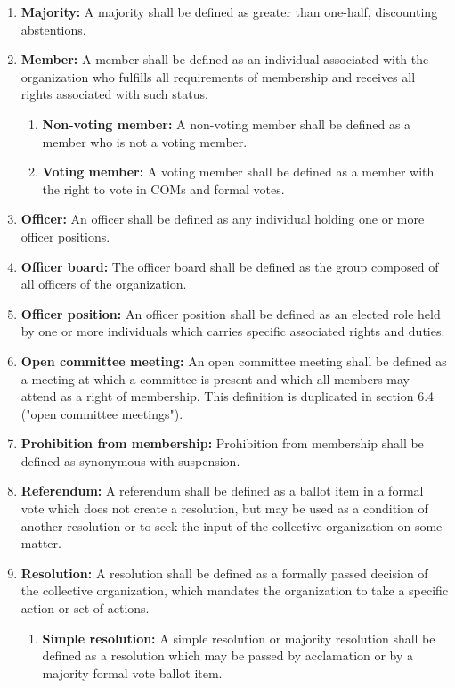 \documentclass[11pt]{article}
\newcounter{h1}
\newcounter{h2}[h1]
\newcounter{h3}[h2]
\begin{document}
\begin{enumerate}
  \item \textbf{Majority:} A majority shall be defined as greater than one-half, discounting abstentions.  
  \item \textbf{Member:} A member shall be defined as an individual associated with the organization who fulfills all requirements of membership and receives all rights associated with such status.  
    \begin{enumerate}
      \item \textbf{Non-voting member:} A non-voting member shall be defined as a member who is not a voting member.  
      \item \textbf{Voting member:} A voting member shall be defined as a member with the right to vote in COMs and formal votes.  
    \end{enumerate}
  \item \textbf{Officer:} An officer shall be defined as any individual holding one or more officer positions.  
  \item \textbf{Officer board:} The officer board shall be defined as the group composed of all officers of the organization.  
  \item \textbf{Officer position:} An officer position shall be defined as an elected role held by one or more individuals which carries specific associated rights and duties.  
  \item \textbf{Open committee meeting:} An open committee meeting shall be defined as a meeting at which a committee is present and which all members may attend as a right of membership. This definition is duplicated in section 6.4 ("open committee meetings").   
  \item \textbf{Prohibition from membership:} Prohibition from membership shall be defined as synonymous with suspension.  
  \item \textbf{Referendum:} A referendum shall be defined as a ballot item in a formal vote which does not create a resolution, but may be used as a condition of another resolution or to seek the input of the collective organization on some matter.  
  \item \textbf{Resolution:} A resolution shall be defined as a formally passed decision of the collective organization, which mandates the organization to take a specific action or set of actions.  
    \begin{enumerate}
      \item \textbf{Simple resolution:} A simple resolution or majority resolution shall be defined as a resolution which may be passed by acclamation or by a majority formal vote ballot item.  

\end{enumerate}
\end{enumerate}
\end{document}
